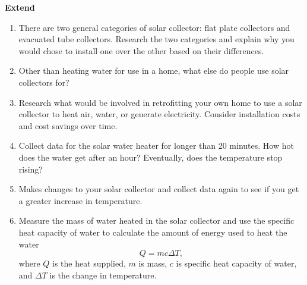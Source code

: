 \documentclass[english,twoside]{article}
\begin{document}
\textbf{Extend}
\begin{enumerate}
	\item There are two general categories of solar collector: flat plate collectors and evacuated tube collectors. Research the two categories and explain why you would chose to install one over the other based on their differences. 
	\item Other than heating water for use in a home, what else do people use solar collectors for? 
	\item Research what would be involved in retrofitting your own home to use a solar collector to heat air, water, or generate electricity. Consider installation costs and cost savings over time. 
	\item Collect data for the solar water heater for longer than 20 minutes. How hot does the water get after an hour? Eventually, does the temperature stop rising?
	\item Makes changes to your solar collector and collect data again to see if you get a greater increase in temperature. 
	\item Measure the mass of water heated in the solar collector and use the specific heat capacity of water to calculate the amount of energy used to heat the water
\begin{equation*}
	Q = mc \Delta T ,
\end{equation*}
where $Q$ is the heat supplied, $m$ is mass, $c$ is specific heat capacity of water, and $\Delta T$ is the change in temperature.
\end{enumerate}
\end{document}
